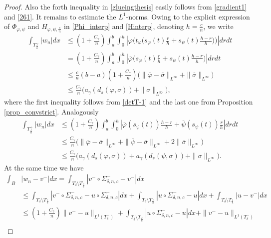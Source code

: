 \documentclass[a4paper,11pt]{article}
\numberwithin{equation}{section}
\begin{document}
\begin{proof}
Also  the forth inequality in \eqref{glueingthesis} easily follows from \eqref{gradient1} and \eqref{261}.
It remains to estimate the $L^1$-norms. Owing to the explicit expression of $\Phi_{\varphi,\psi}$ and $H_{\varphi,\psi,\frac cn}$ in \eqref{Phi_interp} and  \eqref{Hinterp}, denoting $h=\frac cn$, we write
\begin{align*}
\int_{T^-_{\frac{c}{n}}}|w_n|dx&\leq (1+\frac{C_\gamma}{n})\int_a^b\int_0^h|\varphi\Big(t_\varphi\big(s_\varphi(t)\frac{r}{h}+s_\psi(t)\frac{h-r}{h} \big)\Big)|drdt\\
&=(1+\frac{C_\gamma}{n})\int_a^b\int_0^h|\overline \varphi\big(s_\varphi(t)\frac{r}{h}+s_\psi(t)\frac{h-r}{h} \big)|drdt\\
&\leq \frac{c}{n}(b-a)(1+\frac{C_\gamma}{n})\big(\|\overline \varphi-\overline \sigma\|_{L^\infty}+\|\overline \sigma\|_{L^\infty}\big)\\
&\leq \frac{C_\gamma}{n} \big(a_\gamma(d_s(\varphi,\sigma))+\|\sigma\|_{L^\infty}\big),
\end{align*}
where the first inequality follows from \eqref{detT-1} and the last one from Proposition \ref{prop_convstrict}. Analogously
\begin{align*}
	\int_{T^+_{\frac{c}{n}}}|w_n|dx&\leq (1+\frac{C_\gamma}{n})\int_a^b\int_0^h|\overline \varphi(s_\psi(t))\frac{h-r}{h}+\overline \psi(s_\psi(t))\frac{r}{h}|drdt\\&
	\leq \frac{C_\gamma}{n}\big(\|\overline \varphi-\overline \sigma\|_{L^\infty}+\|\overline \psi-\overline \sigma\|_{L^\infty}+2\|\overline \sigma\|_{L^\infty}\big)\\
	&\leq \frac{C_\gamma}{n} \big(a_\gamma(d_s(\varphi,\sigma))+a_\gamma(d_s(\psi,\sigma))+\|\sigma\|_{L^\infty}\big).
\end{align*}
At the same time we have
\begin{align*}
\int_B&|w_n-v^-|dx=\int_{T_\delta\setminus T_{\frac cn}}|v^-\circ\Sigma_{\delta,n,c}^- -v^-|dx\\
&\leq  \int_{T_\delta\setminus T_{\frac cn}}|v^-\circ\Sigma_{\delta,n,c}^- -u\circ\Sigma_{\delta,n,c}^-|dx+\int_{T_\delta\setminus T_{\frac cn}}|u\circ\Sigma_{\delta,n,c}^--u|dx+\int_{T_\delta\setminus T_{\frac cn}}|u-v^-|dx\\
&\leq (1+\frac{C_\gamma}{n})\|v^--u\|_{L^1(T_\delta^-)}+\int_{T_\delta\setminus T_{\frac cn}}|u\circ\Sigma_{\delta,n,c}^--u|dx+\|v^--u\|_{L^1(T_\delta^-)}\\

\end{align*}
\end{proof}
\end{document}
